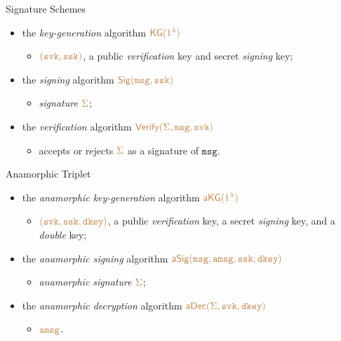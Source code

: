 \documentclass[]{beamer}
\newcommand{\secprm}{\lambda}
\newcommand{\algofont}[1]{{\mathsf{#1}}}
\newcommand{\objfont}[1]{{\mathtt{#1}}}
\newcommand{\kg}{\algofont{KG}}
\newcommand{\dec}{\algofont{Dec}}
\newcommand{\adec}{\algofont{a}\dec}
\newcommand{\dkey}{\objfont{dkey}}  %
\newcommand{\signPrefix}{\algofont{}}
\newcommand{\signkg}{\signPrefix\kg}
\newcommand{\signsign}{\signPrefix\algofont{Sig}}
\newcommand{\signverify}{\signPrefix\algofont{Verify}}
\newcommand{\signOPrefix}{\objfont{s}}
\newcommand{\svk}{\signOPrefix\objfont{vk}}
\newcommand{\ssk}{\signOPrefix\objfont{sk}}
\newcommand{\ssignature}{\objfont{sig}}
\renewcommand{\ssignature}{\Sigma}
\newcommand{\msg}{{\mathtt{msg}}}
\newcommand{\amsg}{{\mathtt{amsg}}}
\newcommand{\anamorphicPrefix}{\algofont{a}}
\newcommand{\asignkg}{\anamorphicPrefix\signkg}
\newcommand{\asignsign}{\anamorphicPrefix\signsign}
\begin{document}
\begin{frame}
\begin{block}{Signature Schemes}
\begin{itemize}
\item the {\em\color{purple} key-generation} algorithm $\color{brown} \signkg(1^\secprm)$ 
    \begin{itemize}
        \item $\color{brown} (\svk,\ssk)$,
        a public {\em\color{purple} verification} key and secret {\em\color{purple} signing} key;
    \end{itemize}
\item  the {\em\color{purple} signing} algorithm $\color{brown} \signsign(\msg,\ssk)$ 
    \begin{itemize}
        \item {\em\color{purple} signature} $\color{brown} \ssignature$;
    \end{itemize}
\item the {\em\color{purple} verification} algorithm $\color{brown} \signverify(\ssignature,\msg,\svk)$ 
    \begin{itemize}
        \item accepts or rejects $\color{brown} \ssignature$ as a signature of $\msg$.
    \end{itemize}
\end{itemize}
\end{block}

\begin{block}{Anamorphic Triplet}
\begin{itemize}
\item the {\em\color{purple} anamorphic key-generation} algorithm $\color{brown} \asignkg(1^\secprm)$ 
    \begin{itemize}
        \item $\color{brown} (\svk,\ssk,\dkey)$,
        a public {\em\color{purple} verification} key, 
        a secret {\em\color{purple} signing} key, and a
        {\em\color{purple} double} key;
    \end{itemize}
\item  the {\em\color{purple} anamorphic signing} algorithm 
    $\color{brown} \asignsign(\msg,\amsg,\ssk,\dkey)$ 
    \begin{itemize}
        \item {\em\color{purple} anamorphic signature} $\color{brown} \ssignature$;
    \end{itemize}
\item the {\em\color{purple} anamorphic decryption} algorithm
    $\color{brown} \adec(\ssignature,\svk,\dkey)$ 
    \begin{itemize}
        \item $\color{brown} \amsg$.
    \end{itemize}
\end{itemize}
\end{block}
\end{frame}
\end{document}

